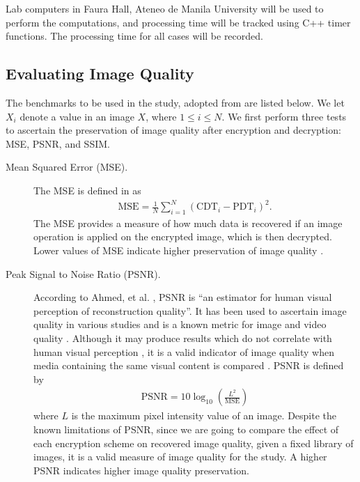 Lab computers in Faura Hall, Ateneo de Manila University will be used to perform the computations, and processing time will be tracked using C++ timer functions.
The processing time for all cases will be recorded.

\subsection{Evaluating Image Quality}
The benchmarks to be used in the study, adopted from \cite{ahmed_benchmark_2016, ahmad_efficiency_2012, wu_npcr_2011} are listed below. We let $X_i$ denote a value in an image $X$, where $1 \leq i \leq N$.
We first perform three tests to ascertain the preservation of image quality after encryption and decryption: MSE, PSNR, and SSIM.
\begin{description}
	\item [Mean Squared Error (MSE).] The MSE is defined in \cite{ahmed_benchmark_2016} as
	\begin{align}
        \mathrm{MSE} = \frac{1}{N}\sum_{i=1}^{N}{(\mathrm{CDT}_i - \mathrm{PDT}_i)^2}.
	\end{align}
	The MSE provides a measure of how much data is recovered if an image operation is applied on the encrypted image, which is then decrypted. Lower values of MSE indicate higher preservation of image quality \cite{ahmed_benchmark_2016, ahmad_efficiency_2012}.
	\item [Peak Signal to Noise Ratio (PSNR).]
	According to Ahmed, et al. \cite{ahmed_benchmark_2016}, PSNR is ``an estimator for human visual perception of reconstruction quality''. It has been used to ascertain image quality in various studies and is a known metric for image and video quality \cite{upmanyu_efficient_2009, jain_image_2016, akramullah_video_2014}. Although it may produce results which do not correlate with human visual perception \cite{huynh-thu_accuracy_2012, ahmed_benchmark_2016}, it is a valid indicator of image quality when media containing the same visual content is compared \cite{huynh-thu_accuracy_2012}.
	PSNR is defined by
	\begin{align}
        \mathrm{PSNR} = 10\log_{10}{\left( \frac{L^2}{\mathrm{MSE}} \right)}
	\end{align}
	where $L$ is the maximum pixel intensity value of an image.
	Despite the known limitations of PSNR, since we are going to compare the effect of each encryption scheme on recovered image quality, given a fixed library of images, it is a valid measure of image quality for the study. A higher PSNR indicates higher image quality preservation.

\end{description}
